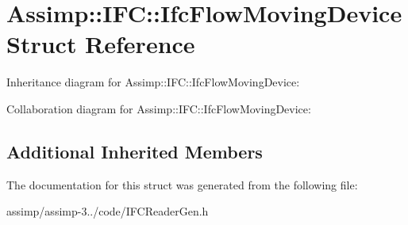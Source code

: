 \hypertarget{struct_assimp_1_1_i_f_c_1_1_ifc_flow_moving_device}{\section{Assimp\+:\+:I\+F\+C\+:\+:Ifc\+Flow\+Moving\+Device Struct Reference}
\label{struct_assimp_1_1_i_f_c_1_1_ifc_flow_moving_device}
}


Inheritance diagram for Assimp\+:\+:I\+F\+C\+:\+:Ifc\+Flow\+Moving\+Device\+:


Collaboration diagram for Assimp\+:\+:I\+F\+C\+:\+:Ifc\+Flow\+Moving\+Device\+:
\subsection*{Additional Inherited Members}


The documentation for this struct was generated from the following file\+:\begin{DoxyCompactItemize}
\item 
assimp/assimp-\/3../code/I\+F\+C\+Reader\+Gen.\+h\end{DoxyCompactItemize}
